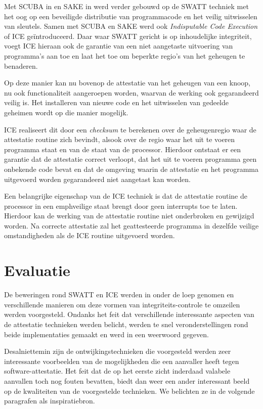 Met SCUBA in \citep{seshadri2006scuba} en SAKE in \citep{seshadri2008sake} werd
verder gebouwd op de SWATT techniek met het oog op een beveiligde distributie
van programmacode en het veilig uitwisselen van sleutels. Samen met SCUBA en
SAKE werd ook \emph{Indisputable Code Execution} of ICE ge\"introduceerd. Daar
waar SWATT gericht is op inhoudelijke integriteit, voegt ICE hieraan ook de
garantie van een niet aangetaste uitvoering van programma's aan toe en laat het
toe om beperkte regio's van het geheugen te benaderen.

Op deze manier kan nu bovenop de attestatie van het geheugen van een knoop, nu
ook functionaliteit aangeroepen worden, waarvan de werking ook gegarandeerd
veilig is. Het installeren van nieuwe code en het uitwisselen van gedeelde
geheimen wordt op die manier mogelijk.

ICE realiseert dit door een \emph{checksum} te berekenen over de geheugenregio
waar de attestatie routine zich bevindt, alsook over de regio waar het uit te
voeren programma staat en van de staat van de processor. Hierdoor ontstaat er
een garantie dat de attestatie correct verloopt, dat het uit te voeren
programma geen onbekende code bevat en dat de omgeving waarin de attestatie en
het programma uitgevoerd worden gegarandeerd niet aangetast kan worden.

Een belangrijke eigenschap van de ICE techniek is dat de attestatie routine de
processor in een emph{veilige} staat brengt door geen interrupts toe te laten.
Hierdoor kan de werking van de attestatie routine niet onderbroken en gewijzigd
worden. Na correcte attestatie zal het geattesteerde programma in dezelfde
veilige omstandigheden als de ICE routine uitgevoerd worden.

\section{Evaluatie}

De beweringen rond SWATT en ICE werden in \citep{castelluccia2009difficulty}
onder de loep genomen en verschillende manieren om deze vormen van
integriteits-controle te omzeilen werden voorgesteld. Ondanks het feit dat
verschillende interessante aspecten van de attestatie technieken werden
belicht, werden te snel veronderstellingen rond beide implementaties gemaakt en
werd in \citep{perrig2010refutation} een weerwoord gegeven.

Desalniettemin zijn de ontwijkingstechnieken die voorgesteld werden zeer
interessante voorbeelden van de mogelijkheden die een aanvaller heeft tegen
software-attestatie. Het feit dat de op het eerste zicht inderdaad valabele
aanvallen toch nog fouten bevatten, biedt dan weer een ander interessant beeld
op de kwaliteiten van de voorgestelde technieken. We belichten ze in de
volgende paragrafen als inspiratiebron.

